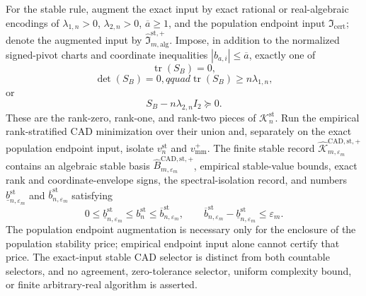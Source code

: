 For the stable rule, augment the exact input by exact rational or real-algebraic encodings of \(\lambda_{1,n}>0\), \(\lambda_{2,n}>0\), \(\overline a\ge1\), and the population endpoint input \(\mathfrak I_{\mathrm{cert}}\); denote the augmented input by \(\widehat{\mathfrak I}_{m,\mathrm{alg}}^{\mathrm{st},+}\).  Impose, in addition to the normalized signed-pivot charts and coordinate inequalities \(|b_{a,i}|\le\overline a\), exactly one of
\[
\operatorname{tr}(S_B)=0,
\]
\[
\det(S_B)=0,qquad \operatorname{tr}(S_B)\ge n\lambda_{1,n},
\]
or
\[
S_B-n\lambda_{2,n}I_2\succeq0.
\]
These are the rank-zero, rank-one, and rank-two pieces of \(\mathcal K_n^{\mathrm{st}}\).  Run the empirical rank-stratified CAD minimization over their union and, separately on the exact population endpoint input, isolate \(v_n^{\mathrm{st}}\) and \(v_{\mathrm{mm}}^+\).  The finite stable record \(\widehat{\mathscr K}_{m,\varepsilon_m}^{\mathrm{CAD,st},+}\) contains an algebraic stable basis \(\widehat B_{m,\varepsilon_m}^{\mathrm{CAD,st},+}\), empirical stable-value bounds, exact rank and coordinate-envelope signs, the spectral-isolation record, and numbers \(\underline b_{n,\varepsilon_m}^{\mathrm{st}}\) and \(\overline b_{n,\varepsilon_m}^{\mathrm{st}}\) satisfying
\[
0\le\underline b_{n,\varepsilon_m}^{\mathrm{st}}
\le b_n^{\mathrm{st}}
\le\overline b_{n,\varepsilon_m}^{\mathrm{st}},
\qquad
\overline b_{n,\varepsilon_m}^{\mathrm{st}}
-\underline b_{n,\varepsilon_m}^{\mathrm{st}}
\le\varepsilon_m.
\]
The population endpoint augmentation is necessary only for the enclosure of the population stability price; empirical endpoint input alone cannot certify that price.  The exact-input stable CAD selector is distinct from both countable selectors, and no agreement, zero-tolerance selector, uniform complexity bound, or finite arbitrary-real algorithm is asserted.